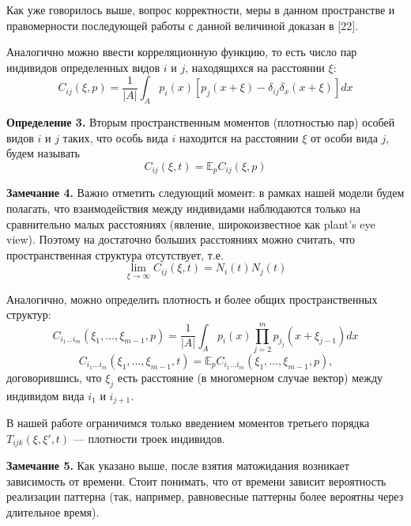Как уже говорилось выше, вопрос корректности, меры в данном пространстве и правомерности последующей работы с данной величиной доказан в [22].

Аналогично можно ввести корреляционную функцию, то есть число пар индивидов определенных видов $ i $ и $ j $, находящихся на расстоянии $ \xi $:
\begin{equation*}
C_{ij}(\xi,p)=\frac{1}{|A|}\int_{A}p_{i}(x)[p_{j}(x+\xi)-\delta_{ij}\delta_{x}(x+\xi)]dx
\end{equation*}

\textbf{Определение 3.} Вторым пространственным моментов (плотностью пар) особей видов $ i $ и $ j $ таких, что особь вида $ i $ находится на расстоянии $ \xi $ от особи вида $ j $, будем называть
\begin{equation*}
C_{ij}(\xi,t)=\mathbb{E}_{p}C_{ij}(\xi,p)
\end{equation*}

\textbf{Замечание 4.} Важно отметить следующий момент: в рамках нашей модели будем полагать, что взаимодействия между индивидами наблюдаются только на сравнительно малых расстояниях (явление, широкоизвестное как plant's eye view). Поэтому на достаточно больших расстояниях можно считать, что пространственная структура отсутствует, т.е.
\begin{equation*}
\lim_{\xi\to\infty}C_{ij}(\xi,t)=N_{i}(t)N_{j}(t)
\end{equation*}

Аналогично, можно определить плотность и более общих пространственных структур: 
\begin{equation*}
C_{i_{1}\ldots i_{m}}(\xi_{1},\ldots,\xi_{m-1},p)=\frac{1}{|A|}\int_{A}p_{i}(x)\prod_{j=2}^{m}p_{j_{j}}(x+\xi_{j-1})dx
\end{equation*}
\begin{equation*}
C_{i_{1}\ldots i_{m}}(\xi_{1},\ldots,\xi_{m-1},t)=\mathbb{E}_{p}C_{i_{1}\ldots i_{m}}(\xi_{1},\ldots,\xi_{m-1},p)\text{,}
\end{equation*}
договорившись, что $ \xi_{j} $ есть расстояние (в многомерном случае вектор) между индивидом вида $ i_{1} $ и $ i_{j+1} $.

В нашей работе ограничимся только введением моментов третьего порядка $ T_{ijk}(\xi,\xi',t) $ --- плотности троек индивидов.

\textbf{Замечание 5.} Как указано выше, после взятия матожидания возникает зависимость от времени. Стоит понимать, что от времени зависит вероятность реализации паттерна (так, например, равновесные паттерны более вероятны через длительное время).


